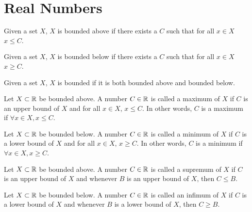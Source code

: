 \chapter{Real Numbers}\label{cha:realnums}

\begin{definition}\label{def:boundabove}
   \leanok
  Given a set $X$,
  $X$ is bounded above if there exists a $C$ such that for all $x \in X$ $x \leq C$.
\end{definition}

\begin{definition}\label{def:boundbelow}
   \leanok
  Given a set $X$,
  $X$ is bounded below if there exists a $C$ such that for all $x \in X$ $x \geq C$.
\end{definition}

\begin{definition}[Bounded]\label{def:bound}
   \leanok
  Given a set $X$,
  $X$ is bounded if it is both bounded above and bounded below.
\end{definition}

\begin{definition}[Maximum]\label{def:maximum}
   \leanok
  Let $X \subset \mathbb{R}$ be bounded above.
  A number $C \in \mathbb{R}$ is called a maximum of $X$ if $C$ is an upper bound of $X$ and for all $x \in X$, $x \leq C$.
  In other words,
  $C$ is a maximum if $\forall x \in X, x \leq C$.
\end{definition}

\begin{definition}[Minimum]\label{def:minimum}
   \leanok
  Let $X \subset \mathbb{R}$ be bounded below.
  A number $C \in \mathbb{R}$ is called a minimum of $X$ if $C$ is a lower bound of $X$ and for all $x \in X$, $x \geq C$.
  In other words,
  $C$ is a minimum if $\forall x \in X, x \geq C$.
\end{definition}

\begin{definition}[Supremum]\label{def:supremum}
   \leanok
  Let $X \subset \mathbb{R}$ be bounded above.
  A number $C \in \mathbb{R}$ is called a supremum of $X$ if $C$ is an upper bound of $X$ and whenever $B$ is an upper bound of $X$,
  then $C \leq B$.
\end{definition}

\begin{definition}[Infimum]\label{def:infimum}
   \leanok
  Let $X \subset \mathbb{R}$ be bounded below.
  A number $C \in \mathbb{R}$ is called an infimum of $X$ if $C$ is a lower bound of $X$ and whenever $B$ is a lower bound of $X$,
  then $C \geq B$.
\end{definition}

